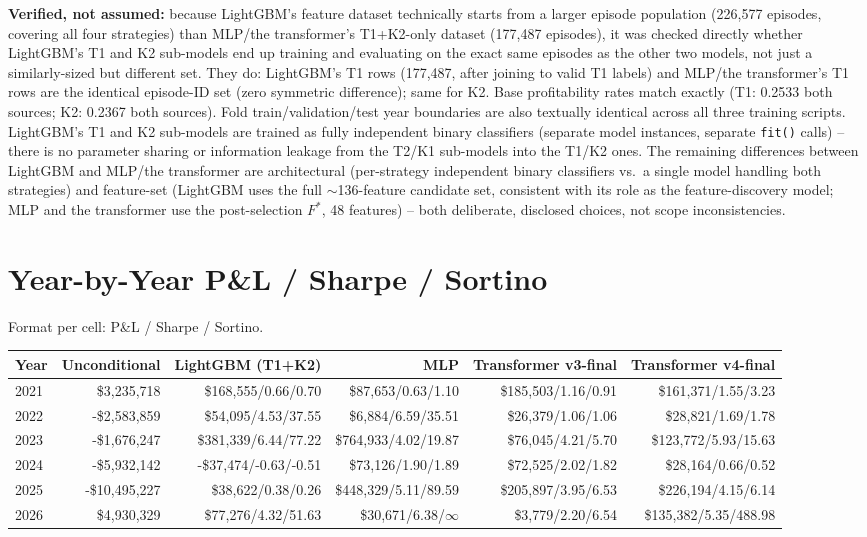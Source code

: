 \documentclass[11pt]{article}
\begin{document}
\textbf{Verified, not assumed:} because LightGBM's feature dataset technically starts from a larger
episode population (226,577 episodes, covering all four strategies) than MLP/the transformer's
T1+K2-only dataset (177,487 episodes), it was checked directly whether LightGBM's T1 and K2 sub-models
end up training and evaluating on the exact same episodes as the other two models, not just a
similarly-sized but different set. They do: LightGBM's T1 rows (177,487, after joining to valid T1 labels)
and MLP/the transformer's T1 rows are the identical episode-ID set (zero symmetric difference); same for
K2. Base profitability rates match exactly (T1: 0.2533 both sources; K2: 0.2367 both sources). Fold
train/validation/test year boundaries are also textually identical across all three training scripts.
LightGBM's T1 and K2 sub-models are trained as fully independent binary classifiers (separate model
instances, separate \texttt{fit()} calls) -- there is no parameter sharing or information leakage from the
T2/K1 sub-models into the T1/K2 ones. The remaining differences between LightGBM and MLP/the transformer
are architectural (per-strategy independent binary classifiers vs.\ a single model handling both
strategies) and feature-set (LightGBM uses the full $\sim$136-feature candidate set, consistent with its
role as the feature-discovery model; MLP and the transformer use the post-selection $F^*$, 48 features) --
both deliberate, disclosed choices, not scope inconsistencies.

\section{Year-by-Year P\&L / Sharpe / Sortino}
Format per cell: P\&L / Sharpe / Sortino.
\begin{table}[H]
\centering
\scriptsize
\begin{tabular}{lrrrrr}
\toprule
Year & Unconditional & LightGBM (T1+K2) & MLP & Transformer v3-final & Transformer v4-final \\
\midrule
2021 & \$3,235,718 & \$168,555/0.66/0.70 & \$87,653/0.63/1.10 & \$185,503/1.16/0.91 & \$161,371/1.55/3.23 \\
2022 & -\$2,583,859 & \$54,095/4.53/37.55 & \$6,884/6.59/35.51 & \$26,379/1.06/1.06 & \$28,821/1.69/1.78 \\
2023 & -\$1,676,247 & \$381,339/6.44/77.22 & \$764,933/4.02/19.87 & \$76,045/4.21/5.70 & \$123,772/5.93/15.63 \\
2024 & -\$5,932,142 & -\$37,474/-0.63/-0.51 & \$73,126/1.90/1.89 & \$72,525/2.02/1.82 & \$28,164/0.66/0.52 \\
2025 & -\$10,495,227 & \$38,622/0.38/0.26 & \$448,329/5.11/89.59 & \$205,897/3.95/6.53 & \$226,194/4.15/6.14 \\
2026 & \$4,930,329 & \$77,276/4.32/51.63 & \$30,671/6.38/$\infty$ & \$3,779/2.20/6.54 & \$135,382/5.35/488.98 \\
\bottomrule
\end{tabular}
\end{table}
\end{document}
